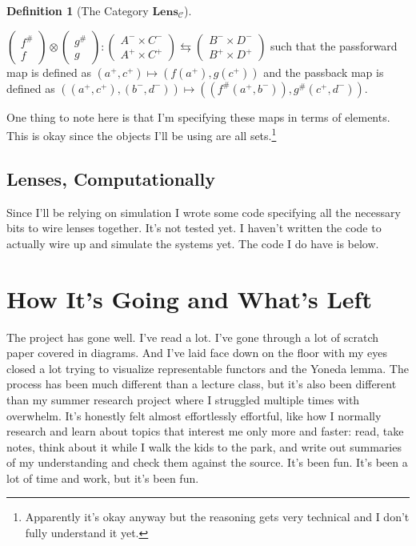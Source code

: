 \documentclass{article}
\theoremstyle{definition}
\newtheorem{definition}{Definition}
\begin{document}
\begin{definition}[The Category $\textbf{Lens}_\mathcal{C}$]
\begin{enumerate}
              $\begin{pmatrix}f^{\#}\\f\end{pmatrix} \otimes \begin{pmatrix}g^{\#}\\g\end{pmatrix}:\begin{pmatrix}A^- \times C^-\\A^+ \times C^+\end{pmatrix}\leftrightarrows\begin{pmatrix}B^- \times D^-\\B^+ \times D^+\end{pmatrix}$
              such that the passforward map is defined as $(a^+, c^+) \mapsto (f(a^+), g(c^+))$ and the passback map is defined as $((a^+, c^+), (b^-, d^-)) \mapsto ((f^\#(a^+, b^-)), g^\#(c^+, d^-))$.
    \end{enumerate}
    One thing to note here is that I'm specifying these maps in terms of elements.
    This is okay since the objects I'll be using are all sets.\footnote{Apparently it's okay anyway but the reasoning gets very technical and I don't fully understand it yet.}
\end{definition}

\subsection*{Lenses, Computationally}
Since I'll be relying on simulation I wrote some code specifying all the necessary bits to wire lenses together.
It's not tested yet.
I haven't written the code to actually wire up and simulate the systems yet.
The code I do have is below.


\small{}

\normalsize{}


\section*{How It's Going and What's Left}
The project has gone well.
I've read a lot.
I've gone through a lot of scratch paper covered in diagrams.
And I've laid face down on the floor with my eyes closed a lot trying to visualize representable functors and the Yoneda lemma.
The process has been much different than a lecture class, but it's also been different than my summer research project where I struggled multiple times with overwhelm.
It's honestly felt almost effortlessly effortful, like how I normally research and learn about topics that interest me only more and faster: read, take notes, think about it while I walk the kids to the park, and write out summaries of my understanding and check them against the source.
It's been fun.
It's been a lot of time and work, but it's been fun.
\end{document}
